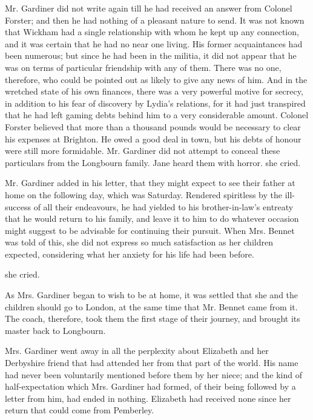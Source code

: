 
Mr. Gardiner did not write again till he had received an answer from Colonel Forster; and then he had nothing of a pleasant nature to send. It was not known that Wickham had a single relationship with whom he kept up any connection, and it was certain that he had no near one living. His former acquaintances had been numerous; but since he had been in the militia, it did not appear that he was on terms of particular friendship with any of them. There was no one, therefore, who could be pointed out as likely to give any news of him. And in the wretched state of his own finances, there was a very powerful motive for secrecy, in addition to his fear of discovery by Lydia's relations, for it had just transpired that he had left gaming debts behind him to a very considerable amount. Colonel Forster believed that more than a thousand pounds would be necessary to clear his expenses at Brighton. He owed a good deal in town, but his debts of honour were still more formidable. Mr. Gardiner did not attempt to conceal these particulars from the Longbourn family. Jane heard them with horror.  she cried. 

Mr. Gardiner added in his letter, that they might expect to see their father at home on the following day, which was Saturday. Rendered spiritless by the ill-success of all their endeavours, he had yielded to his brother-in-law's entreaty that he would return to his family, and leave it to him to do whatever occasion might suggest to be advisable for continuing their pursuit. When Mrs. Bennet was told of this, she did not express so much satisfaction as her children expected, considering what her anxiety for his life had been before.

 she cried. 

As Mrs. Gardiner began to wish to be at home, it was settled that she and the children should go to London, at the same time that Mr. Bennet came from it. The coach, therefore, took them the first stage of their journey, and brought its master back to Longbourn.

Mrs. Gardiner went away in all the perplexity about Elizabeth and her Derbyshire friend that had attended her from that part of the world. His name had never been voluntarily mentioned before them by her niece; and the kind of half-expectation which Mrs. Gardiner had formed, of their being followed by a letter from him, had ended in nothing. Elizabeth had received none since her return that could come from Pemberley.


